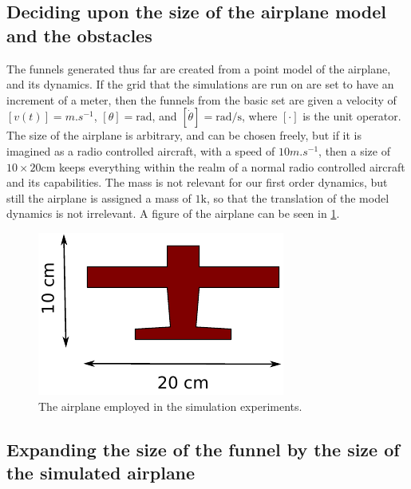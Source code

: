 \subsection{Deciding upon the size of the airplane model and the obstacles}
\label{subsec:deciding-model-size}

The funnels generated thus far are created from a point model of the airplane,
and its dynamics. If the grid that the simulations are run on are set to have an
increment of a meter, then the funnels from the basic set are given a velocity
of \([v(t)] = \si{m.s^{-1}}\), \([\theta] = \si{\radian}\), and \([\dot{\theta}]
= \si{\radian\per\second}\), where \([\cdot]\) is the unit operator. The size of
the airplane is arbitrary, and can be chosen freely, but if it is imagined as a
radio controlled aircraft, with a speed of \(10\si{m.s^{-1}}\), then a size of
\(10 \times 20 \si{\centi\metre} \) keeps everything within the realm of a
normal radio controlled aircraft and its capabilities. The mass is not relevant
for our first order dynamics, but still the airplane is assigned a mass of \(1
\si{\kilo}\), so that the translation of the model dynamics is not irrelevant. A
figure of the airplane can be seen in \cref{fig:radio-vehicle}.

\begin{figure}
  \centering
  \includegraphics[width=.8\textwidth]{figures/experiments/radio-vehicle-model}
  \caption{The airplane employed in the simulation experiments.}
  \label{fig:radio-vehicle}
\end{figure}

\subsection{Expanding the size of the funnel by the size of the simulated
  airplane}
\label{subsec:expand-funnel}

